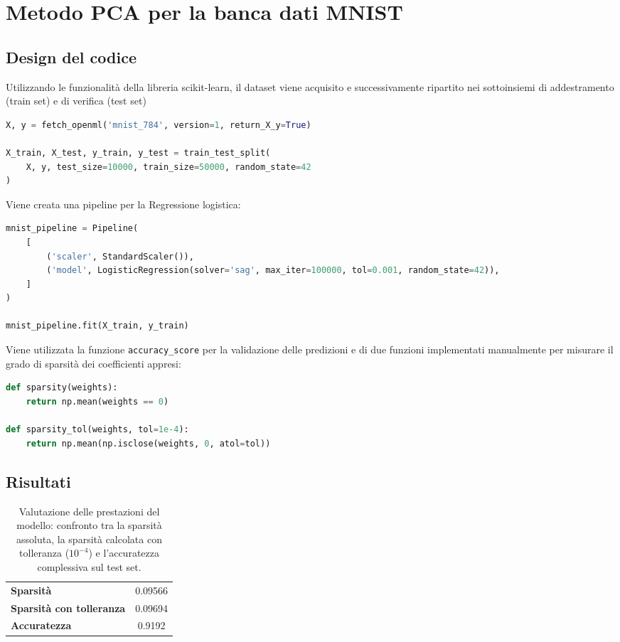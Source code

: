 \documentclass[a4paper,11pt]{article}
\begin{document}
\section{Metodo PCA per la banca dati MNIST}
\subsection{Design del codice}

Utilizzando le funzionalità della libreria scikit-learn, il dataset viene acquisito e successivamente ripartito nei sottoinsiemi di addestramento (train set) e di verifica (test set)
\begin{lstlisting}[language=Python]
X, y = fetch_openml('mnist_784', version=1, return_X_y=True)

X_train, X_test, y_train, y_test = train_test_split(
    X, y, test_size=10000, train_size=50000, random_state=42
)
\end{lstlisting}

Viene creata una pipeline per la Regressione logistica:
\begin{lstlisting}[language=Python]
mnist_pipeline = Pipeline(
    [
        ('scaler', StandardScaler()),
        ('model', LogisticRegression(solver='sag', max_iter=100000, tol=0.001, random_state=42)),
    ]
)

mnist_pipeline.fit(X_train, y_train)
\end{lstlisting}

Viene utilizzata la funzione \texttt{accuracy\_score} per la validazione delle predizioni e di due funzioni implementati manualmente per misurare il grado di sparsità dei coefficienti appresi:
\begin{lstlisting}[language=Python]
def sparsity(weights):
    return np.mean(weights == 0)

def sparsity_tol(weights, tol=1e-4):
    return np.mean(np.isclose(weights, 0, atol=tol))
\end{lstlisting}

\subsection{Risultati}

\begin{table}[h]
\centering
\footnotesize
\caption{Valutazione delle prestazioni del modello: confronto tra la sparsità assoluta, la sparsità calcolata con tolleranza ($10^{-4}$) e l'accuratezza complessiva sul test set.}
\label{tab:risultati_2}
\begin{tabular}{lc}
\toprule
\textbf{Sparsità} & 0.09566 \\
\textbf{Sparsità con tolleranza} & 0.09694 \\
\textbf{Accuratezza} & 0.9192 \\
\bottomrule
\end{tabular}
\end{table}
\end{document}
